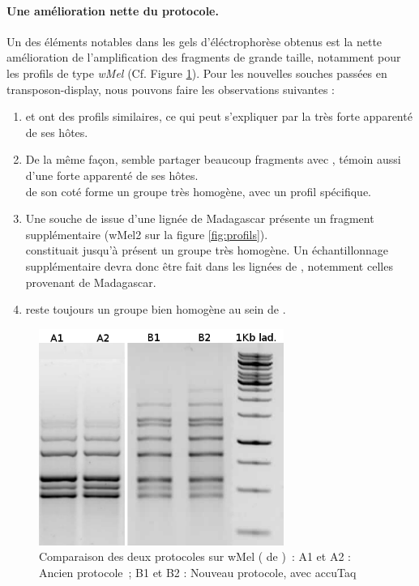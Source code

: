 \paragraph{Une amélioration nette du protocole.} %
\label{par:proto}
Un des éléments notables dans les gels d'éléctrophorèse obtenus est la nette amélioration de l'amplification des fragments de grande taille, notamment pour les profils de type \textit{wMel} (Cf. Figure \ref{fig:wMelcomp}). 
Pour les nouvelles souches passées en transposon-display, nous pouvons faire les observations suivantes : 
\begin{enumerate}
	\item {} et  ont des profils similaires, ce qui peut s’expliquer par la très forte apparenté de ses hôtes.
	\item De la même façon,  semble partager beaucoup fragments avec , témoin aussi d’une forte apparenté de ses hôtes.\\
	 de son coté forme un groupe très homogène, avec un profil spécifique.
	\item Une souche de  issue d’une lignée de Madagascar présente un fragment supplémentaire (wMel2 sur la figure \ref{fig:profils}).\\
	 constituait jusqu’à présent un groupe très homogène.
	Un échantillonnage supplémentaire devra donc être fait dans les lignées de , notemment celles provenant de Madagascar.
	\item {} reste toujours un groupe bien homogène au sein de .
\end{enumerate}

\begin{figure}[h]
	\begin{center}
		\includegraphics[width=80mm]{images/wMel_comp.png}
	\end{center}
	\caption{Comparaison des deux protocoles sur wMel ( de )~:
	A1 et A2 : Ancien protocole\cite{memHH}~;
	B1 et B2 : Nouveau protocole, avec accuTaq}
	\label{fig:wMelcomp}
\end{figure}

